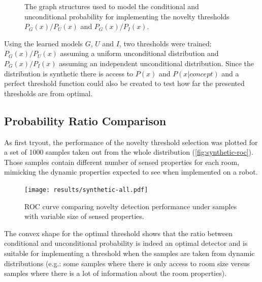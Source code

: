 \documentclass[runningheads,a4paper]{llncs}
\begin{document}
\begin{figure}[h]
\centering

\qquad
{}
\qquad
{}

\caption{\label{fig:simple-experiment}The graph structures used to model the
         conditional and unconditional probability for implementing the novelty
         thresholds $P_G(x)/P_U(x)$ and $P_G(x)/P_I(x)$.}
\end{figure}

Using the learned models $G$, $U$ and $I$, two thresholds were trained:
$P_G(x)/P_U(x)$ assuming a uniform unconditional distribution
and $P_G(x)/P_I(x)$ assuming an independent unconditional distribution.
Since the distribution is synthetic there is access to $P(x)$ and $P(x|concept)$
and a perfect threshold function could also be created to test how far the
presented thresholds are from optimal.

\subsection{Probability Ratio Comparison}
As first tryout, the performance of the novelty threshold selection was plotted for a set
of 1000 samples taken out from the whole distribution (\autoref{fig:synthetic-roc}).
Those samples contain different number of sensed properties for each room, mimicking
the dynamic properties expected to see when implemented on a robot.

\begin{figure}[h]
\centering
\texttt{[image: results/synthetic-all.pdf]}

\caption{\label{fig:synthetic-roc}ROC curve comparing novelty detection performance
         under samples with variable size of sensed properties.}
\end{figure}

The convex shape for the optimal threshold shows that the ratio between conditional
and unconditional probability is indeed an optimal detector and is suitable for
implementing a threshold when the samples are taken from dynamic
distributions (e.g.: some samples where there is only access to room size versus
samples where there is a lot of information about the room properties).
\end{document}
